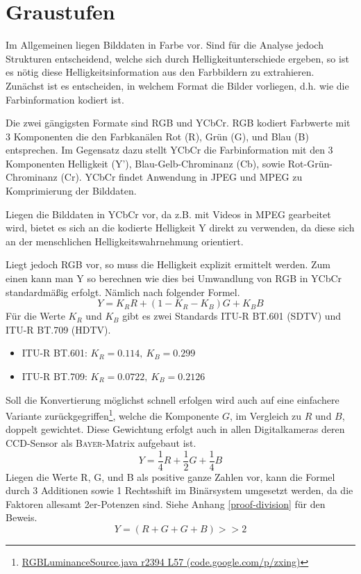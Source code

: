 \section*{Graustufen}
\writtenby{\dcauthornameewie}%
Im Allgemeinen liegen Bilddaten in Farbe vor.
Sind für die Analyse jedoch Strukturen entscheidend, welche sich durch Helligkeitunterschiede ergeben, so ist es nötig diese Helligkeitsinformation aus den Farbbildern zu extrahieren.
Zunächst ist es entscheiden, in welchem Format die Bilder vorliegen, d.h. wie die Farbinformation kodiert ist.

Die zwei gängigsten Formate sind RGB und YCbCr.
RGB kodiert Farbwerte mit 3 Komponenten die den Farbkanälen Rot (R), Grün (G), und Blau (B) entsprechen.
Im Gegensatz dazu stellt YCbCr die Farbinformation mit den 3 Komponenten Helligkeit (Y'), Blau-Gelb-Chrominanz (Cb), sowie Rot-Grün-Chrominanz (Cr).
YCbCr findet Anwendung in JPEG und MPEG zu Komprimierung der Bilddaten.

Liegen die Bilddaten in YCbCr vor, da z.B. mit Videos in MPEG gearbeitet wird, bietet es sich an die kodierte Helligkeit Y direkt zu verwenden, da diese sich an der menschlichen Helligkeitswahrnehmung orientiert.

Liegt jedoch RGB vor, so muss die Helligkeit explizit ermittelt werden.
Zum einen kann man Y so berechnen wie dies bei Umwandlung von RGB in YCbCr standardmäßig erfolgt.
Nämlich nach folgender Formel.
  \[ Y = K_R R + (1 - K_R - K_B) G + K_B B \]
Für die Werte $K_R$ und $K_B$ gibt es zwei Standards ITU-R BT.601 (SDTV) und ITU-R BT.709 (HDTV).
%
\begin{itemize}
\item ITU-R BT.601: $K_R=0.114,~K_B=0.299$
\item ITU-R BT.709: $K_R=0.0722,~K_B=0.2126$
\end{itemize}
%
Soll die Konvertierung möglichst schnell erfolgen wird auch auf eine einfachere Variante zurückgegriffen\footnote{\href{https://code.google.com/p/zxing/source/browse/trunk/core/src/com/google/zxing/RGBLuminanceSource.java?spec=svn2633&r=2394\#57}{RGBLuminanceSource.java r2394 L57 (code.google.com/p/zxing)}}, welche die Komponente $G$, im Vergleich zu $R$ und $B$, doppelt gewichtet.
Diese Gewichtung erfolgt auch in allen Digitalkameras deren CCD-Sensor als \textsc{Bayer}-Matrix aufgebaut ist.
  \[ Y = \frac{1}{4} R + \frac{1}{2} G + \frac{1}{4}B \]
Liegen die Werte R, G, und B als positive ganze Zahlen vor, kann die Formel durch 3 Additionen sowie 1 Rechtsshift im Binärsystem umgesetzt werden, da die Faktoren allesamt 2er-Potenzen sind.
Siehe Anhang \ref{proof-division} für den Beweis.
  \[ Y = (R + G + G + B) >\!\!> 2 \]
